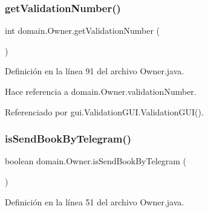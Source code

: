 \subsubsection{\texorpdfstring{getValidationNumber()}{getValidationNumber()}}
{\footnotesize\ttfamily int domain.\+Owner.\+get\+Validation\+Number (\begin{DoxyParamCaption}{ }\end{DoxyParamCaption})}



Definición en la línea 91 del archivo Owner.\+java.


\begin{DoxyCode}{0}

\end{DoxyCode}


Hace referencia a domain.\+Owner.\+validation\+Number.



Referenciado por gui.\+Validation\+G\+U\+I.\+Validation\+G\+U\+I().

\mbox{\label{classdomain_1_1_owner_a89052fe74fcb66cc60d3c7ee7d3e2d75}} 
\subsubsection{\texorpdfstring{isSendBookByTelegram()}{isSendBookByTelegram()}}
{\footnotesize\ttfamily boolean domain.\+Owner.\+is\+Send\+Book\+By\+Telegram (\begin{DoxyParamCaption}{ }\end{DoxyParamCaption})}



Definición en la línea 51 del archivo Owner.\+java.


\begin{DoxyCode}{0}

\end{DoxyCode}



